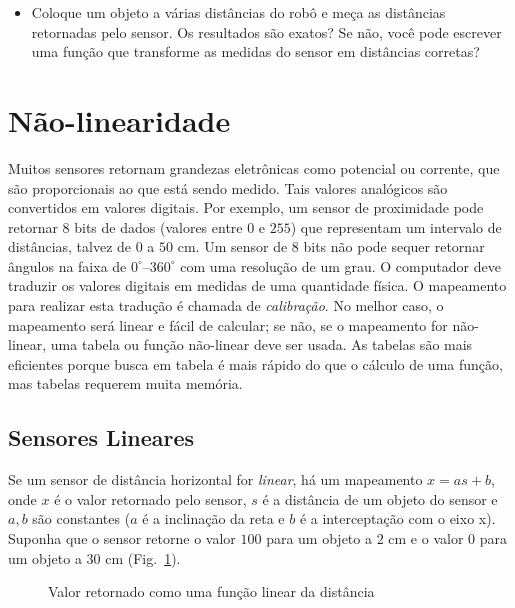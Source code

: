 \begin{framed}
\begin{itemize}
\item Coloque um objeto a várias distâncias do robô e meça as distâncias retornadas pelo sensor. Os resultados são exatos? Se não, você pode escrever uma função que transforme as medidas do sensor em distâncias corretas?
\end{itemize}
\end{framed}

\section{Não-linearidade}\label{s.nonlinearity}

Muitos sensores retornam grandezas eletrônicas como potencial ou corrente, que são proporcionais ao que está sendo medido. Tais valores analógicos são convertidos em valores digitais. Por exemplo, um sensor de proximidade pode retornar $8$ bits de dados (valores entre $0$ e $255$) que representam um intervalo de distâncias, talvez de $0$ a $50$ cm. Um sensor de $8$ bits não pode sequer retornar ângulos na faixa de $0^{\circ}$--$360^{\circ}$ com uma resolução de um grau. O computador deve traduzir os valores digitais em medidas de uma quantidade física. O mapeamento para realizar esta tradução é chamada de \emph{calibração}. No melhor caso, o mapeamento será linear e fácil de calcular; se não, se o mapeamento for não-linear, uma tabela ou função não-linear deve ser usada. As tabelas são mais eficientes porque busca em tabela é mais rápido do que o cálculo de uma função, mas tabelas requerem muita memória.

\subsection{Sensores Lineares}

Se um sensor de distância horizontal for \emph{linear}, há um mapeamento $x = a s + b$, onde $x$ é o valor retornado pelo sensor, $s$ é a distância de um objeto do sensor e $a,b$ são constantes ($a$ é a inclinação da reta e $b$ é a interceptação com o eixo x). Suponha que o sensor retorne o valor $100$ para um objeto a $2$ cm e o valor $0$ para um objeto a $30$ cm (Fig.~\ref{fig.linear}).

\begin{figure}
\begin{center}
\caption{Valor retornado como uma função linear da distância}\label{fig.linear}
\end{center}
\end{figure}

